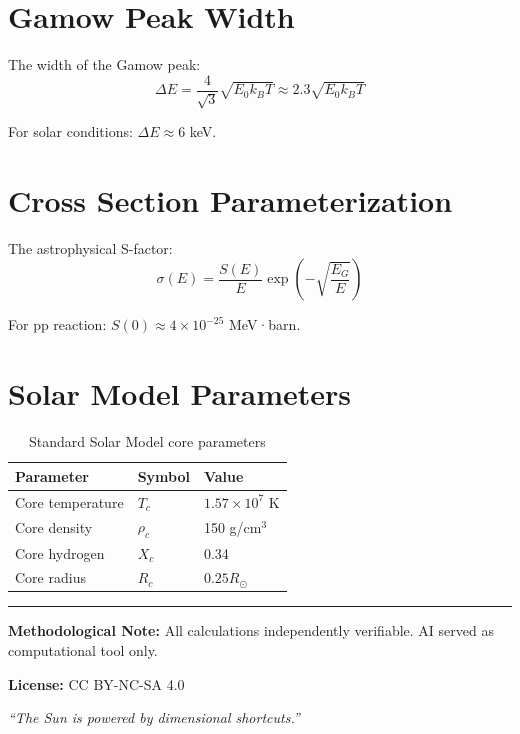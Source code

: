 \documentclass[12pt,a4paper]{article}
\newcommand{\kB}{k_B}
\begin{document}
\appendix

\section{Gamow Peak Width}

The width of the Gamow peak:
\begin{equation}
\Delta E = \frac{4}{\sqrt{3}}\sqrt{E_0 \kB T} \approx 2.3\sqrt{E_0 \kB T}
\end{equation}

For solar conditions: $\Delta E \approx 6$ keV.

\section{Cross Section Parameterization}

The astrophysical S-factor:
\begin{equation}
\sigma(E) = \frac{S(E)}{E}\exp\left(-\sqrt{\frac{E_G}{E}}\right)
\end{equation}

For pp reaction: $S(0) \approx 4 \times 10^{-25}$ MeV·barn.

\section{Solar Model Parameters}

\begin{table}[H]
\centering
\begin{tabular}{@{}lll@{}}
\toprule
\textbf{Parameter} & \textbf{Symbol} & \textbf{Value} \\
\midrule
Core temperature & $T_c$ & $1.57 \times 10^7$ K \\
Core density & $\rho_c$ & 150 g/cm$^3$ \\
Core hydrogen & $X_c$ & 0.34 \\
Core radius & $R_c$ & $0.25 R_\odot$ \\
\bottomrule
\end{tabular}
\caption{Standard Solar Model core parameters}
\end{table}


\vspace{2em}
\noindent\rule{\textwidth}{0.5pt}

\noindent\textbf{Methodological Note:} All calculations independently verifiable. AI served as computational tool only.

\vspace{1em}
\noindent\textbf{License:} CC BY-NC-SA 4.0

\vspace{1em}
\begin{center}
\textit{``The Sun is powered by dimensional shortcuts.''}
\end{center}
\end{document}
